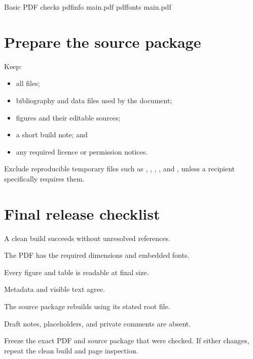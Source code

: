 \begin{terminalcode}{Basic PDF checks}
pdfinfo main.pdf
pdffonts main.pdf
\end{terminalcode}

\section{Prepare the source package}

Keep:

\begin{itemize}
  \item all  files;
  \item bibliography and data files used by the document;
  \item figures and their editable sources;
  \item a short build note; and
  \item any required licence or permission notices.
\end{itemize}

Exclude reproducible temporary files such as , ,
, , and , unless a recipient specifically
requires them.

\section{Final release checklist}

\begin{chapterchecklist}
  \item A clean build succeeds without unresolved references.
  \item The PDF has the required dimensions and embedded fonts.
  \item Every figure and table is readable at final size.
  \item Metadata and visible text agree.
  \item The source package rebuilds using its stated root file.
  \item Draft notes, placeholders, and private comments are absent.
\end{chapterchecklist}

\begin{submissioncheck}
Freeze the exact PDF and source package that were checked. If either changes,
repeat the clean build and page inspection.
\end{submissioncheck}
